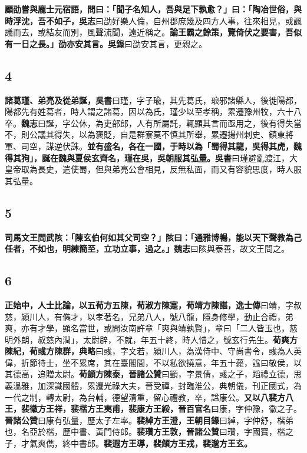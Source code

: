 \textbf{顧劭嘗與龐士元宿語，問曰：「聞子名知人，吾與足下孰愈？」曰：「陶冶世俗，與時浮沈，吾不如子，}{\footnotesize \textbf{吳志}曰劭好樂人倫，自州郡庶幾及四方人事，往來相見，或諷議而去，或結友而別，風聲流聞，遠近稱之。}\textbf{論王霸之餘策，覽倚伏之要害，吾似有一日之長。」劭亦安其言。}{\footnotesize \textbf{吳錄}曰劭安其言，更親之。}

\subsection*{4}

\textbf{諸葛瑾、弟亮及從弟誕，}{\footnotesize \textbf{吳書}曰瑾，字子瑜，其先葛氏，琅邪諸縣人，後徙陽都，陽都先有姓葛者，時人謂之諸葛，因以為氏，瑾少以至孝稱，累遷豫州牧，六十八卒。\textbf{魏志}曰誕，字公休，為吏部郎，人有所屬託，輒顯其言而亟用之，後有得失當不，則公議其得失，以為褒貶，自是群寮莫不慎其所舉，累遷揚州刺史、鎮東將軍、司空，謀逆伏誅。}\textbf{並有盛名，各在一國，于時以為「蜀得其龍，吳得其虎，魏得其狗」，誕在魏與夏侯玄齊名，瑾在吳，吳朝服其弘量。}{\footnotesize \textbf{吳書}曰瑾避亂渡江，大皇帝取為長史，遣使蜀，但與弟亮公會相見，反無私面，而又有容貌思度，時人服其弘量。}

\subsection*{5}

\textbf{司馬文王問武陔：「陳玄伯何如其父司空？」陔曰：「通雅博暢，能以天下聲教為己任者，不如也，明練簡至，立功立事，過之。」}{\footnotesize \textbf{魏志}曰陔與泰善，故文王問之。}

\subsection*{6}

\textbf{正始中，人士比論，以五荀方五陳，荀淑方陳寔，荀靖方陳諶，}{\footnotesize \textbf{逸士傳}曰靖，字叔慈，潁川人，有儁才，以孝著名，兄弟八人，號八龍，隱身修學，動止合禮，弟爽，亦有才學，顯名當世，或問汝南許章「爽與靖孰賢」，章曰「二人皆玉也，慈明外朗，叔慈內潤」，太尉辟，不就，年五十終，時人惜之，號玄行先生。}\textbf{荀爽方陳紀，荀彧方陳群，}{\footnotesize \textbf{典略}曰彧，字文若，潁川人，為漢侍中、守尚書令，彧為人英偉，折節待士，坐不累席，其在臺閣間，不以私欲撓意，年五十薨，諡曰敬侯，以其德高，追贈太尉。}\textbf{荀顗方陳泰，}{\footnotesize \textbf{晉諸公贊}曰顗，字景倩，彧之子，蹈禮立德，思義溫雅，加深識國體，累遷光祿大夫，晉受禪，封臨淮公，典朝儀，刊正國式，為一代之制，轉太尉，為台輔，德望清重，留心禮教，卒，諡康公。}\textbf{又以八裴方八王，裴徽方王祥，裴楷方王夷甫，裴康方王綏，}{\footnotesize \textbf{晉百官名}曰康，字仲豫，徽之子。\textbf{晉諸公贊}曰康有弘量，歷太子左率。}\textbf{裴綽方王澄，}{\footnotesize \textbf{王朝目錄}曰綽，字仲舒，楷弟也，名亞於楷，歷中書、黃門侍郎。}\textbf{裴瓚方王敦，}{\footnotesize \textbf{晉諸公贊}曰瓚，字國寶，楷之子，才氣爽儁，終中書郎。}\textbf{裴遐方王導，裴頠方王戎，裴邈方王玄。}

